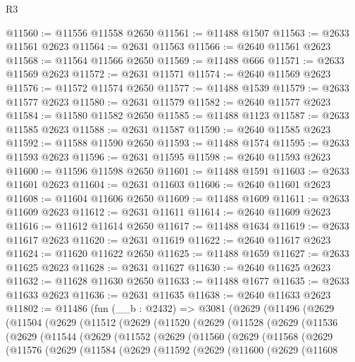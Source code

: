 \begin{lexlean}{R3}
\begin{coremodule}
@11560 := @11556 @11558 @2650
@11561 := @11488 @1507
@11563 := @2633 @11561 @2623
@11564 := @2631 @11563
@11566 := @2640 @11561 @2623
@11568 := @11564 @11566 @2650
@11569 := @11488 @666
@11571 := @2633 @11569 @2623
@11572 := @2631 @11571
@11574 := @2640 @11569 @2623
@11576 := @11572 @11574 @2650
@11577 := @11488 @1539
@11579 := @2633 @11577 @2623
@11580 := @2631 @11579
@11582 := @2640 @11577 @2623
@11584 := @11580 @11582 @2650
@11585 := @11488 @1123
@11587 := @2633 @11585 @2623
@11588 := @2631 @11587
@11590 := @2640 @11585 @2623
@11592 := @11588 @11590 @2650
@11593 := @11488 @1574
@11595 := @2633 @11593 @2623
@11596 := @2631 @11595
@11598 := @2640 @11593 @2623
@11600 := @11596 @11598 @2650
@11601 := @11488 @1591
@11603 := @2633 @11601 @2623
@11604 := @2631 @11603
@11606 := @2640 @11601 @2623
@11608 := @11604 @11606 @2650
@11609 := @11488 @1609
@11611 := @2633 @11609 @2623
@11612 := @2631 @11611
@11614 := @2640 @11609 @2623
@11616 := @11612 @11614 @2650
@11617 := @11488 @1634
@11619 := @2633 @11617 @2623
@11620 := @2631 @11619
@11622 := @2640 @11617 @2623
@11624 := @11620 @11622 @2650
@11625 := @11488 @1659
@11627 := @2633 @11625 @2623
@11628 := @2631 @11627
@11630 := @2640 @11625 @2623
@11632 := @11628 @11630 @2650
@11633 := @11488 @1677
@11635 := @2633 @11633 @2623
@11636 := @2631 @11635
@11638 := @2640 @11633 @2623
@11802 := @11486
    (fun (__b : @2432) =>
    @3081
      (@2629
        (@11496
          (@2629
            (@11504
              (@2629
                (@11512
                  (@2629
                    (@11520
                      (@2629
                        (@11528
                          (@2629
                            (@11536
                              (@2629
                                (@11544
                                  (@2629
                                    (@11552
                                      (@2629
                                        (@11560
                                          (@2629
                                            (@11568
                                              (@2629
                                                (@11576
                                                  (@2629
                                                    (@11584
                                                      (@2629
                                                        (@11592
                                                          (@2629
                                                            (@11600
                                                              (@2629
                                                                (@11608

\end{coremodule}
\end{lexlean}
